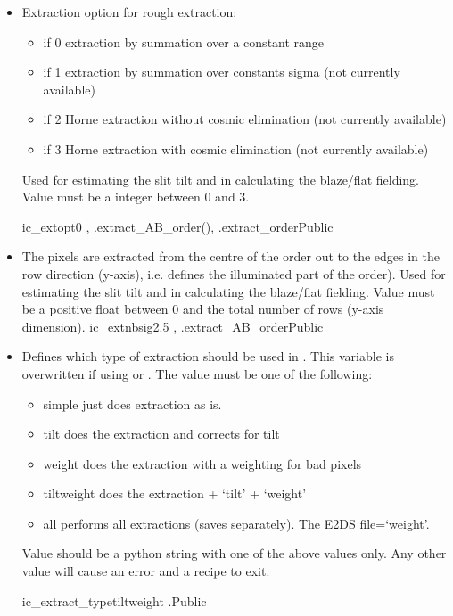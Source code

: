 \begin{itemize}

\item {}
{Extraction option for rough extraction:
\begin{itemize}
\item if 0 extraction by summation over a constant range
\item if 1 extraction by summation over constants sigma (not currently available)
\item if 2 Horne extraction without cosmic elimination (not currently available)
\item if 3 Horne extraction with cosmic elimination (not currently available)
\end{itemize}
 Used for estimating the slit tilt and in calculating the blaze/flat fielding. Value must be a integer between 0 and 3.
}
{ic\_extopt}{0}
{\calSLIT, \calFFraw}{\constantsfile}
{\spirouEXTOR.extract\_AB\_order(), \spirouEXTOR.extract\_order}{Public}

\item {}
{The pixels are extracted from the centre of the order out to the edges in the row direction (y-axis), i.e. defines the illuminated part of the order). Used for estimating the slit tilt and in calculating the blaze/flat fielding. Value must be a positive float between 0 and the total number of rows (y-axis dimension).}
{ic\_extnbsig}{2.5}
{\calSLIT, \calFFraw}{\constantsfile}{\spirouEXTOR.extract\_AB\_order}{Public}


\item {} 
{Defines which type of extraction should be used in \calextractRAW. This variable is overwritten if using \calextractRAWAB or \calextractRAWC. The value must be one of the following:
\begin{itemize}
\item simple \dotfill just does extraction as is.
\item tilt \dotfill does the extraction and corrects for tilt
\item weight \dotfill does the extraction with a weighting for bad pixels
\item tiltweight \dotfill does the extraction + `tilt' + `weight'
\item all \dotfill performs all extractions (saves separately). The E2DS file=`weight'.
\end{itemize}
Value should be a python string with one of the above values only. Any other value will cause an error and a recipe to exit.
}
{ic\_extract\_type}{tiltweight}
{\calextractRAW}{\constantsfile}{\calextractRAW.\progMAIN}{Public}


\end{itemize}
